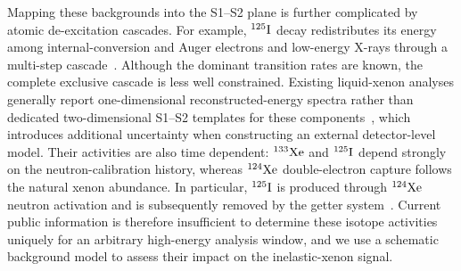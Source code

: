 \documentclass[11pt,a4paper]{article}
\begin{document}
Mapping these backgrounds into the S1--S2 plane is further complicated by atomic de-excitation cascades. For example, $^{125}{\rm I}$ decay redistributes its energy among internal-conversion and Auger electrons and low-energy X-rays through a multi-step cascade~\cite{Alotiby:2019fjj,Tee:2019taa}. Although the dominant transition rates are known, the complete exclusive cascade is less well constrained. Existing liquid-xenon analyses generally report one-dimensional reconstructed-energy spectra rather than dedicated two-dimensional S1--S2 templates for these components~\cite{LZ:2024wvs,PandaX-4T:2024fls,XENON:2022evz}, which introduces additional uncertainty when constructing an external detector-level model. Their activities are also time dependent: $^{133}{\rm Xe}$ and $^{125}{\rm I}$ depend strongly on the neutron-calibration history, whereas $^{124}{\rm Xe}$ double-electron capture follows the natural xenon abundance. In particular, $^{125}{\rm I}$ is produced through $^{124}{\rm Xe}$ neutron activation and is subsequently removed by the getter system~\cite{LZ:2019sgr}. Current public information is therefore insufficient to determine these isotope activities uniquely for an arbitrary high-energy analysis window, and we use a schematic background model to assess their impact on the inelastic-xenon signal.
\end{document}
